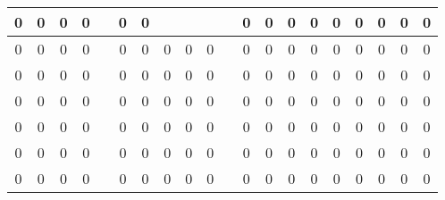 \documentclass[a4paper]{article}
\begin{document}
{\begin{tabular}{|c|c|c|c|c|c|c|c|c|c|c|c|c|c|c|c|c|c|c|c|}
\cellcolor{black}0 & \cellcolor{black}0 & \cellcolor{black}0 & \cellcolor{black}0 &  & \cellcolor{black}0 & \cellcolor{black}0 &  &  &  &  & \cellcolor{black}0 & \cellcolor{black}0 & \cellcolor{black}0 & \cellcolor{black}0 & \cellcolor{black}0 & \cellcolor{black}0 & \cellcolor{black}0 & \cellcolor{black}0 & \cellcolor{black}0\\ \hline
\cellcolor{black}0 & \cellcolor{black}0 & \cellcolor{black}0 & \cellcolor{black}0 &  & \cellcolor{black}0 & \cellcolor{black}0 & \cellcolor{black}0 & \cellcolor{black}0 & \cellcolor{black}0 &  & \cellcolor{black}0 & \cellcolor{black}0 & \cellcolor{black}0 & \cellcolor{black}0 & \cellcolor{black}0 & \cellcolor{black}0 & \cellcolor{black}0 & \cellcolor{black}0 & \cellcolor{black}0\\ \hline
\cellcolor{black}0 & \cellcolor{black}0 & \cellcolor{black}0 & \cellcolor{black}0 &  & \cellcolor{black}0 & \cellcolor{black}0 & \cellcolor{black}0 & \cellcolor{black}0 & \cellcolor{black}0 &  & \cellcolor{black}0 & \cellcolor{black}0 & \cellcolor{black}0 & \cellcolor{black}0 & \cellcolor{black}0 & \cellcolor{black}0 & \cellcolor{black}0 & \cellcolor{black}0 & \cellcolor{black}0\\ \hline
\cellcolor{black}0 & \cellcolor{black}0 & \cellcolor{black}0 & \cellcolor{black}0 &  & \cellcolor{black}0 & \cellcolor{black}0 & \cellcolor{black}0 & \cellcolor{black}0 & \cellcolor{black}0 &  & \cellcolor{black}0 & \cellcolor{black}0 & \cellcolor{black}0 & \cellcolor{black}0 & \cellcolor{black}0 & \cellcolor{black}0 & \cellcolor{black}0 & \cellcolor{black}0 & \cellcolor{black}0\\ \hline
\cellcolor{black}0 & \cellcolor{black}0 & \cellcolor{black}0 & \cellcolor{black}0 &  & \cellcolor{black}0 & \cellcolor{black}0 & \cellcolor{black}0 & \cellcolor{black}0 & \cellcolor{black}0 &  & \cellcolor{black}0 & \cellcolor{black}0 & \cellcolor{black}0 & \cellcolor{black}0 & \cellcolor{black}0 & \cellcolor{black}0 & \cellcolor{black}0 & \cellcolor{black}0 & \cellcolor{black}0\\ \hline
\cellcolor{black}0 & \cellcolor{black}0 & \cellcolor{black}0 & \cellcolor{black}0 &  & \cellcolor{black}0 & \cellcolor{black}0 & \cellcolor{black}0 & \cellcolor{black}0 & \cellcolor{black}0 &  & \cellcolor{black}0 & \cellcolor{black}0 & \cellcolor{black}0 & \cellcolor{black}0 & \cellcolor{black}0 & \cellcolor{black}0 & \cellcolor{black}0 & \cellcolor{black}0 & \cellcolor{black}0\\ \hline
\cellcolor{black}0 & \cellcolor{black}0 & \cellcolor{black}0 & \cellcolor{black}0 &  & \cellcolor{black}0 & \cellcolor{black}0 & \cellcolor{black}0 & \cellcolor{black}0 & \cellcolor{black}0 &  & \cellcolor{black}0 & \cellcolor{black}0 & \cellcolor{black}0 & \cellcolor{black}0 & \cellcolor{black}0 & \cellcolor{black}0 & \cellcolor{black}0 & \cellcolor{black}0 & \cellcolor{black}0\\ \hline

\end{tabular}}
\end{document}
